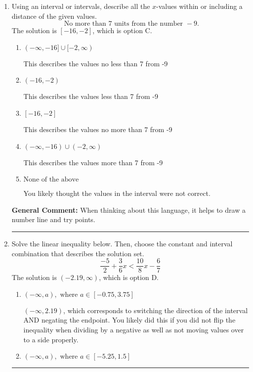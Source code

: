 \documentclass{extbook}[14pt]
\newcommand{\litem}[1]{\item #1

\rule{\textwidth}{0.4pt}}
\begin{document}
\begin{enumerate}
{\begin{enumerate}[label=\Alph*.]
$(-\infty, 5.67) \cup [-1.44, \infty)$, which corresponds to displaying the and-inequality as an or-inequality and getting negatives of the actual endpoints.
\item \( \text{None of the above.} \)

* This is correct as the answer should be $(-5.67, 1.44]$.
\end{enumerate}

\textbf{General Comment:} To solve, you will need to break up the compound inequality into two inequalities. Be sure to keep track of the inequality! It may be best to draw a number line and graph your solution.
}
\litem{
Using an interval or intervals, describe all the $x$-values within or including a distance of the given values.
\[ \text{ No more than } 7 \text{ units from the number } -9. \]The solution is \( [-16, -2] \), which is option C.\begin{enumerate}[label=\Alph*.]
\item \( (-\infty, -16] \cup [-2, \infty) \)

This describes the values no less than 7 from -9
\item \( (-16, -2) \)

This describes the values less than 7 from -9
\item \( [-16, -2] \)

This describes the values no more than 7 from -9
\item \( (-\infty, -16) \cup (-2, \infty) \)

This describes the values more than 7 from -9
\item \( \text{None of the above} \)

You likely thought the values in the interval were not correct.
\end{enumerate}

\textbf{General Comment:} When thinking about this language, it helps to draw a number line and try points.
}
\litem{
Solve the linear inequality below. Then, choose the constant and interval combination that describes the solution set.
\[ \frac{-5}{2} + \frac{3}{6} x < \frac{10}{8} x - \frac{6}{7} \]The solution is \( (-2.19, \infty) \), which is option D.\begin{enumerate}[label=\Alph*.]
\item \( (-\infty, a), \text{ where } a \in [-0.75, 3.75] \)

 $(-\infty, 2.19)$, which corresponds to switching the direction of the interval AND negating the endpoint. You likely did this if you did not flip the inequality when dividing by a negative as well as not moving values over to a side properly.
\item \( (-\infty, a), \text{ where } a \in [-5.25, 1.5] \)


\end{enumerate}}
\end{enumerate}
\end{document}
